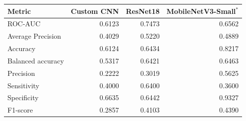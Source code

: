 \begin{tabular}{lrrr}
\toprule
Metric & Custom CNN & ResNet18 & MobileNetV3-Small$^{*}$ \\
\midrule
ROC-AUC & 0.6123 & 0.7473 & 0.6562 \\
Average Precision & 0.4029 & 0.5220 & 0.4889 \\
Accuracy & 0.6124 & 0.6434 & 0.8217 \\
Balanced accuracy & 0.5317 & 0.6421 & 0.6463 \\
Precision & 0.2222 & 0.3019 & 0.5625 \\
Sensitivity & 0.4000 & 0.6400 & 0.3600 \\
Specificity & 0.6635 & 0.6442 & 0.9327 \\
F1-score & 0.2857 & 0.4103 & 0.4390 \\
\bottomrule
\end{tabular}
